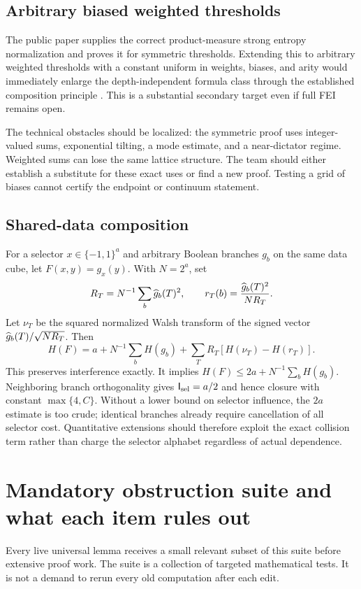 \documentclass[11pt]{article}
\newcommand{\bits}{\{-1,1\}}\newcommand{\KL}{\operatorname{D}}
\begin{document}
\subsection{Arbitrary biased weighted thresholds}

The public paper supplies the correct product-measure strong entropy normalization and proves it for symmetric thresholds. Extending this to arbitrary weighted thresholds with a constant uniform in weights, biases, and arity would immediately enlarge the depth-independent formula class through the established composition principle \cite{ODT,Threshold}. This is a substantial secondary target even if full FEI remains open.

The technical obstacles should be localized: the symmetric proof uses integer-valued sums, exponential tilting, a mode estimate, and a near-dictator regime. Weighted sums can lose the same lattice structure. The team should either establish a substitute for these exact uses or find a new proof. Testing a grid of biases cannot certify the endpoint or continuum statement.

\subsection{Shared-data composition}

For a selector $x\in\bits^a$ and arbitrary Boolean branches $g_b$ on the same data cube, let $F(x,y)=g_x(y)$. With $N=2^a$, set
\[
 R_T=N^{-1}\sum_b\widehat{g}_b(T)^2,\qquad
 r_T(b)=\frac{\widehat{g}_b(T)^2}{NR_T}.
\]
Let $\nu_T$ be the squared normalized Walsh transform of the signed vector $\widehat{g}_b(T)/\sqrt{NR_T}$. Then
\[
 H(F)=a+N^{-1}\sum_bH(g_b)
       +\sum_T R_T[H(\nu_T)-H(r_T)].
\]
This preserves interference exactly. It implies $H(F)\le2a+N^{-1}\sum_bH(g_b)$. Neighboring branch orthogonality gives $\mathsf I_{\rm sel}=a/2$ and hence closure with constant $\max\{4,C\}$. Without a lower bound on selector influence, the $2a$ estimate is too crude; identical branches already require cancellation of all selector cost. Quantitative extensions should therefore exploit the exact collision term rather than charge the selector alphabet regardless of actual dependence.

\section{Mandatory obstruction suite and what each item rules out}

Every live universal lemma receives a small relevant subset of this suite before extensive proof work. The suite is a collection of targeted mathematical tests. It is not a demand to rerun every old computation after each edit.
\end{document}
